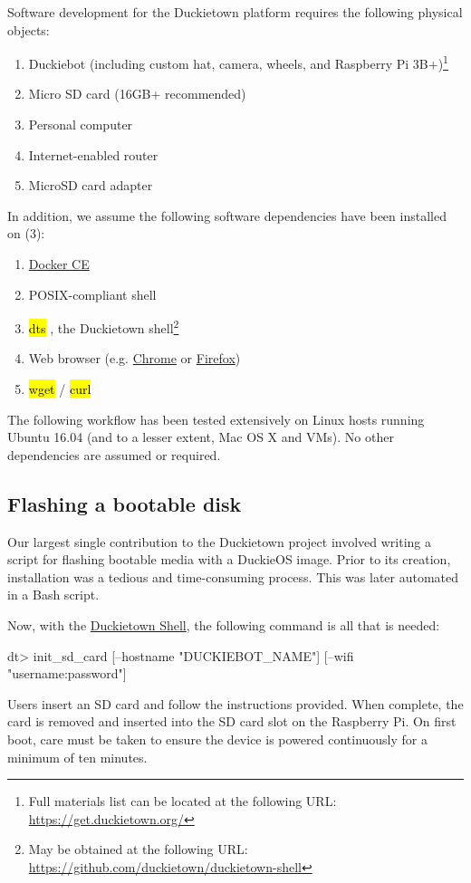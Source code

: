 \documentclass[12pt,initial,twoside,maitrise]{dms}
\newcommand{\inline}[1]{%
    \begingroup%
    \sethlcolor{slightgray}%
    \hl{\ttfamily\small #1}%
    \endgroup
}
\numberwithin{equation}{section}
\numberwithin{table}{chapter}
\numberwithin{figure}{chapter}
\begin{document}
\noindent Software development for the Duckietown platform requires the following physical objects:
%
\begin{enumerate}
    \item Duckiebot (including custom hat, camera, wheels, and Raspberry Pi 3B+)\footnote{Full materials list can be located at the following URL: \url{https://get.duckietown.org/}}
    \item Micro SD card (16GB+ recommended)
    \item Personal computer
    \item Internet-enabled router
    \item MicroSD card adapter
\end{enumerate}
%
In addition, we assume the following software dependencies have been installed on (3):
%
\begin{enumerate}[label=(\alph*)]
    \item \href{https://get.docker.com}{Docker CE}
    \item POSIX-compliant shell
    \item \inline{dts}, the Duckietown shell\footnote{May be obtained at the following URL: \url{https://github.com/duckietown/duckietown-shell}}
    \item Web browser (e.g. \href{https://www.google.com/chrome/}{Chrome} or \href{http://mozilla.org/firefox/}{Firefox})
    \item \inline{wget}/\inline{curl}
\end{enumerate}

\noindent The following workflow has been tested extensively on Linux hosts running Ubuntu 16.04 (and to a lesser extent, Mac OS X and VMs). No other dependencies are assumed or required.

\subsection{Flashing a bootable disk}

Our largest single contribution to the Duckietown project involved writing a script for flashing bootable media with a DuckieOS image. Prior to its creation, installation was a tedious and time-consuming process. This was later automated in a Bash script.

%
Now, with the \href{https://github.com/duckietown/duckietown-shell}{Duckietown Shell}, the following command is all that is needed:
%
\begin{dtslisting}
dt> init_sd_card [--hostname "DUCKIEBOT_NAME"] [--wifi "username:password"]
\end{dtslisting}
%
Users insert an SD card and follow the instructions provided. When complete, the card is removed and inserted into the SD card slot on the Raspberry Pi. On first boot, care must be taken to ensure the device is powered continuously for a minimum of ten minutes.
\end{document}
